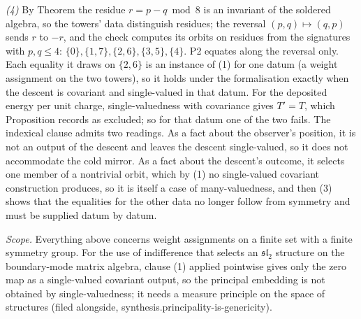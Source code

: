 \emph{(4)} By Theorem  the residue $r = p - q \bmod 8$ is an invariant of the soldered algebra, so the towers' data distinguish residues; the reversal $(p,q) \mapsto (q,p)$ sends $r$ to $-r$, and the check computes its orbits on residues from the signatures with $p, q \leq 4$: $\{0\}, \{1,7\}, \{2,6\}, \{3,5\}, \{4\}$. P2 equates along the reversal only. Each equality it draws on $\{2,6\}$ is an instance of (1) for one datum (a weight assignment on the two towers), so it holds under the formalisation exactly when the descent is covariant and single-valued in that datum. For the deposited energy per unit charge, single-valuedness with covariance gives $T' = T$, which Proposition  records as excluded; so for that datum one of the two fails. The indexical clause admits two readings. As a fact about the observer's position, it is not an output of the descent and leaves the descent single-valued, so it does not accommodate the cold mirror. As a fact about the descent's outcome, it selects one member of a nontrivial orbit, which by (1) no single-valued covariant construction produces, so it is itself a case of many-valuedness, and then (3) shows that the equalities for the other data no longer follow from symmetry and must be supplied datum by datum.

\emph{Scope.} Everything above concerns weight assignments on a finite set with a finite symmetry group. For the use of indifference that selects an $\mathfrak{sl}_2$ structure on the boundary-mode matrix algebra, clause (1) applied pointwise gives only the zero map as a single-valued covariant output, so the principal embedding is not obtained by single-valuedness; it needs a measure principle on the space of structures (filed alongside, synthesis.principality-is-genericity).
